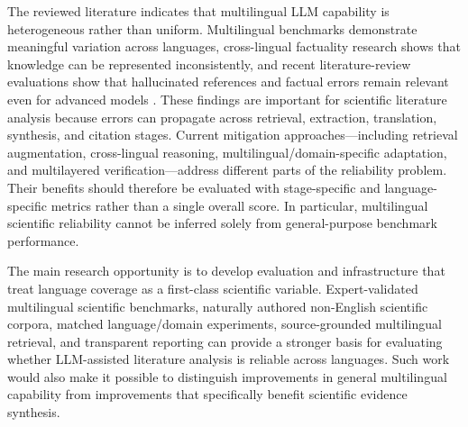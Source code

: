 \documentclass[acmsmall,screen,review]{acmart}
\begin{document}
The reviewed literature indicates that multilingual LLM capability is heterogeneous rather than uniform. Multilingual benchmarks demonstrate meaningful variation across languages, cross-lingual factuality research shows that knowledge can be represented inconsistently, and recent literature-review evaluations show that hallucinated references and factual errors remain relevant even for advanced models \citep{hu2020xtreme,qi2023crosslingual,xuan2025mmlupro,tang2025automated}. These findings are important for scientific literature analysis because errors can propagate across retrieval, extraction, translation, synthesis, and citation stages.
Current mitigation approaches---including retrieval augmentation, cross-lingual reasoning, multilingual/domain-specific adaptation, and multilayered verification---address different parts of the reliability problem. Their benefits should therefore be evaluated with stage-specific and language-specific metrics rather than a single overall score. In particular, multilingual scientific reliability cannot be inferred solely from general-purpose benchmark performance.

The main research opportunity is to develop evaluation and infrastructure that treat language coverage as a first-class scientific variable. Expert-validated multilingual scientific benchmarks, naturally authored non-English scientific corpora, matched language/domain experiments, source-grounded multilingual retrieval, and transparent reporting can provide a stronger basis for evaluating whether LLM-assisted literature analysis is reliable across languages. Such work would also make it possible to distinguish improvements in general multilingual capability from improvements that specifically benefit scientific evidence synthesis.





\end{document}

